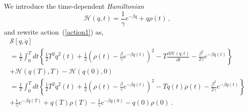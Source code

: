 \documentclass[12pt,a4paper,final]{iopart}
\begin{document}
We introduce the time-dependent {\em Hamiltonian}
\begin{equation}\label{H}
  \mathcal{H}(q,t)
  =
  \frac{1}{\gamma}e^{-\beta q}+q\rho(t)\,,
\end{equation}
and rewrite action~(\ref{action1}) as,
\begin{eqnarray}\label{action}
{\mathcal S}[{q},\dot q] \nonumber
\\
= \frac{1}{T}
\int_0^T dt\left\{
    \frac{1}{2}
    T^2\dot q^2(t) +
    \frac{1}{2}
    \left(\rho(t)-\frac{\beta}{\gamma}e^{-\beta q(t)}\right)^2 -
    T\frac{\partial \mathcal{H}(q,t)}{\partial t} -
    \frac{\beta^2}{2\gamma}e^{-\beta q(t)}
\right\} \nonumber
\\
+ \mathcal{H}(q(T),T) - \mathcal{H}(q(0),0) \nonumber
\\
= \frac{1}{T}
\int_0^T dt\left\{
    \frac{1}{2}
    T^2\dot q^2(t) +
    \frac{1}{2}
    \left(\rho(t)-\frac{\beta}{\gamma}e^{-\beta q(t)}\right)^2 -
    Tq(t)\dot\rho(t) -
     \frac{\beta^2}{2\gamma}e^{-\beta q(t)}
\right\}  \nonumber
\\
+
    \frac{1}{\gamma}e^{-\beta q(T)}+q(T)\rho(T)
   -\frac{1}{\gamma}e^{-\beta q(0)}-q(0)\rho(0)
\,.
\end{eqnarray}
\end{document}
